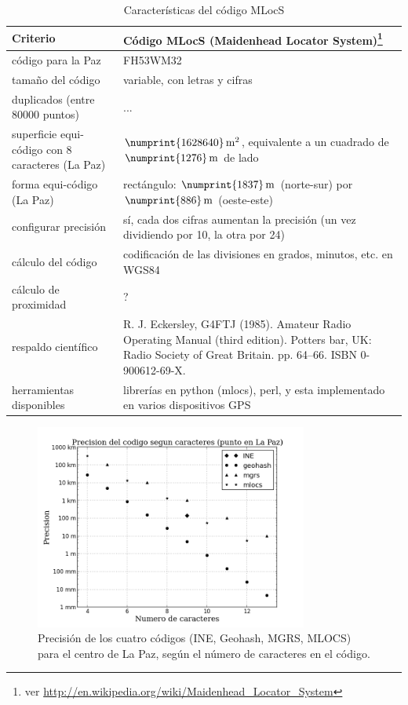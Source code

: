 \documentclass[letterpaper]{article}
\begin{document}
\begin{table}
	\centering
	\begin{tabu} to 
		\hline
		Criterio & Código MLocS (Maidenhead Locator System)\footnote{ver 
		\url{http://en.wikipedia.org/wiki/Maidenhead_Locator_System}} \\
		\hline
		código para la Paz & FH53WM32 \\
		\hline
		tamaño del código & variable, con letras y cifras \\
		\hline
		duplicados (entre 80000 puntos) & ... \\
		\hline
		superficie equi-código con 8 caracteres (La Paz) & 
		\(\numprint{1628640}\,\mathrm{m^{2}}\), 
		equivalente a un cuadrado de \(\numprint{1276}\,\mathrm{m}\) de lado \\
		\hline
		forma equi-código (La Paz) & rectángulo: 
		\(\numprint{1837}\,\mathrm{m}\) (norte-sur) por 
		\(\numprint{886}\,\mathrm{m}\) (oeste-este) \\
		\hline
		configurar precisión & sí, cada dos 
		cifras aumentan la precisión (un vez dividiendo por 10, la 
		otra por 24) \\
		\hline
		cálculo del código & codificación de las divisiones en grados, 
		minutos, etc. en WGS84 \\
		\hline
		cálculo de proximidad & ? \\
		\hline
		respaldo científico & R. J. Eckersley, G4FTJ (1985). Amateur Radio Operating Manual (third edition). Potters bar, UK: Radio Society of Great Britain. pp. 64–66. ISBN 0-900612-69-X. \\
		\hline
		herramientas disponibles & librerías en python (mlocs), perl, 
		y esta implementado en varios dispositivos GPS \\
		\hline
	\end{tabu}
	\caption{Características del código MLocS}
	\label{tab:carac_mlocs}
\end{table}

\begin{figure}[p]
    \centering
    \includegraphics[width=0.8\textwidth]{resultados/precision_codigos.png}
    \caption{Precisión de los cuatro códigos (INE, Geohash, MGRS, 
    MLOCS) para el centro de La Paz, según el número de caracteres 
    en el código.}
    \label{fig:precision_codigos}
\end{figure}
\end{document}
